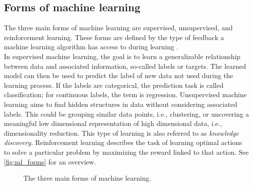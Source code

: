 \subsection{Forms of machine learning}
The three main forms of machine learning are supervised, unsupervised, and reinforcement learning. These forms are defined by the type of feedback a machine learning algorithm has access to during learning \cite{Shalev2014}.\\
In supervised machine learning, the goal is to learn a generalizable relationship between data and associated information, so-called labels or targets. The learned model can then be used to predict the label of new data not used during the learning process. If the labels are categorical, the prediction task is called classification; for continuous labels, the term is regression. Unsupervised machine learning aims to find hidden structures in data without considering associated labels. This could be grouping similar data points, i.e., clustering, or uncovering a meaningful low dimensional representation of high dimensional data, i.e., dimensionality reduction. This type of learning is also referred to as \textit{knowledge discovery}\cite{Murphy2012}. Reinforcement learning describes the task of learning optimal actions to solve a particular problem by maximizing the reward linked to that action. See \autoref{fig:ml_forms} for an overview.

\begin{figure}[h]
\begin{center}
\end{center}
\caption[The three main forms of machine learning.]{The three main forms of machine learning.}
\label{fig:ml_forms}
\end{figure}

